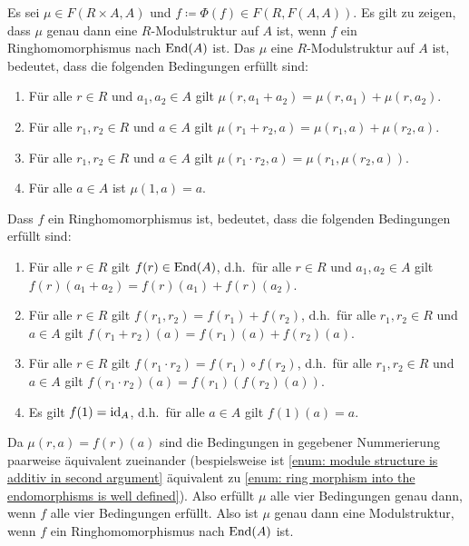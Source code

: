 \documentclass[a4paper, 10pt, numbers=noenddot]{scrartcl}
\begin{document}
Es sei $\mu \in F(R \times A, A)$ und $f \coloneqq \Phi(f) \in F(R, F(A,A))$.
Es gilt zu zeigen, dass $\mu$ genau dann eine $R$-Modulstruktur auf $A$ ist, wenn $f$ ein Ringhomomorphismus nach $\operatorname{End}(A)$ ist.
Das $\mu$ eine $R$-Modulstruktur auf $A$ ist, bedeutet, dass die folgenden Bedingungen erfüllt sind:
\begin{enumerate}[label = (M\arabic*)]
  \item
    \label{enum: module structure is additiv in second argument}
    Für alle $r \in R$ und $a_1, a_2 \in A$ gilt $\mu(r, a_1 + a_2) = \mu(r, a_1) + \mu(r, a_2)$.
  \item
    Für alle $r_1, r_2 \in R$ und $a \in A$ gilt $\mu(r_1 + r_2, a) = \mu(r_1, a) + \mu(r_2, a)$.
  \item
    Für alle $r_1, r_2 \in R$ und $a \in A$ gilt $\mu(r_1 \cdot r_2, a) = \mu(r_1, \mu(r_2, a))$.
  \item
    Für alle $a \in A$ ist $\mu(1, a) = a$.
\end{enumerate}
Dass $f$ ein Ringhomomorphismus ist, bedeutet, dass die folgenden Bedingungen erfüllt sind:
\begin{enumerate}[label = (R\arabic*)]
  \item
    \label{enum: ring morphism into the endomorphisms is well defined}
    Für alle $r \in R$ gilt $f(r) \in \operatorname{End}(A)$, d.h.\ für alle $r \in R$ und $a_1, a_2 \in A$ gilt $f(r)(a_1 + a_2) = f(r)(a_1) + f(r)(a_2)$.
  \item
    Für alle $r \in R$ gilt $f(r_1, r_2) = f(r_1) + f(r_2)$, d.h.\ für alle $r_1, r_2 \in R$ und $a \in A$ gilt $f(r_1 + r_2)(a) = f(r_1)(a) + f(r_2)(a)$.
  \item
    Für alle $r \in R$ gilt $f(r_1 \cdot r_2) = f(r_1) \circ f(r_2)$, d.h.\ für alle $r_1, r_2 \in R$ und $a \in A$ gilt $f(r_1 \cdot r_2)(a) = f(r_1)( f(r_2)(a) )$.
  \item
    Es gilt $f(1) = \operatorname{id}_A$, d.h.\ für alle $a \in A$ gilt $f(1)(a) = a$.
\end{enumerate}
Da $\mu(r,a) = f(r)(a)$ sind die Bedingungen in gegebener Nummerierung paarweise äquivalent zueinander (bespielsweise ist \ref{enum: module structure is additiv in second argument} äquivalent zu \ref{enum: ring morphism into the endomorphisms is well defined}).
Also erfüllt $\mu$ alle vier Bedingungen genau dann, wenn $f$ alle vier Bedingungen erfüllt.
Also ist $\mu$ genau dann eine Modulstruktur, wenn $f$ ein Ringhomomorphismus nach $\operatorname{End}(A)$ ist.
\end{document}
